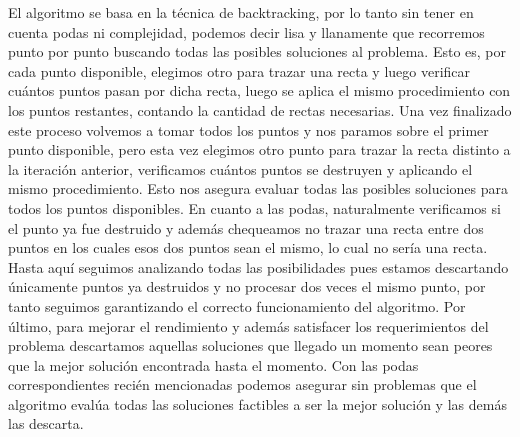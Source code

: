 El algoritmo se basa en la técnica de backtracking, por lo tanto sin tener en cuenta podas ni complejidad, podemos decir lisa y llanamente que recorremos punto por punto buscando todas las posibles soluciones al problema. Esto es, por cada punto disponible, elegimos otro para trazar una recta y luego verificar cuántos puntos pasan por dicha recta, luego se aplica el mismo procedimiento con los puntos restantes, contando la cantidad de rectas necesarias. Una vez finalizado este proceso volvemos a tomar todos los puntos y nos paramos sobre el primer punto disponible, pero esta vez elegimos otro punto para trazar la recta distinto a la iteración anterior, verificamos cuántos puntos se destruyen y aplicando el mismo procedimiento.
Esto nos asegura evaluar todas las posibles soluciones para todos los puntos disponibles.
En cuanto a las podas, naturalmente verificamos si el punto ya fue destruido y además chequeamos no trazar una recta entre dos puntos en los cuales esos dos puntos sean el mismo, lo cual no sería una recta.
Hasta aquí seguimos analizando todas las posibilidades pues estamos descartando únicamente puntos ya destruidos y no procesar dos veces el mismo punto, por tanto seguimos garantizando el correcto funcionamiento del algoritmo.
Por último, para mejorar el rendimiento y además satisfacer los requerimientos del problema descartamos aquellas soluciones que llegado un momento sean peores que la mejor solución encontrada hasta el momento.
Con las podas correspondientes recién mencionadas podemos asegurar sin problemas que el algoritmo evalúa todas las soluciones factibles a ser la mejor solución y las demás las descarta.

